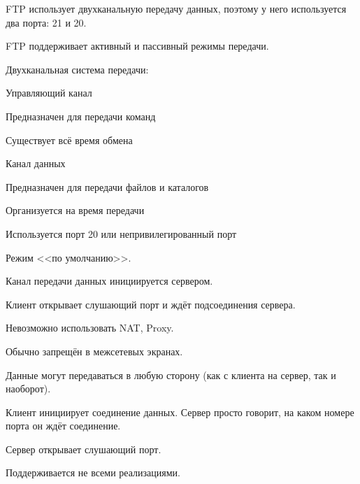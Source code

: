 FTP использует двухканальную передачу данных, поэтому у него используется два порта: 21 и 20.

FTP поддерживает активный и пассивный режимы передачи.

Двухканальная система передачи:
\begin{MyItemize}
    \item Управляющий канал
    \begin{MyItemize}
        \item Предназначен для передачи команд
        \item Существует всё время обмена
    \end{MyItemize}
    \item Канал данных
    \begin{MyItemize}
        \item Предназначен для передачи файлов и каталогов
        \item Организуется на время передачи
        \item Используется порт 20 или непривилегированный порт
    \end{MyItemize}
\end{MyItemize}


Режим <<по умолчанию>>.

Канал передачи данных инициируется сервером.

Клиент открывает слушающий порт и ждёт подсоединения сервера.

Невозможно использовать NAT, Proxy.

Обычно запрещён в межсетевых экранах.

Данные могут передаваться в любую сторону (как с клиента на сервер, так и наоборот).


Клиент инициирует соединение данных. Сервер просто говорит, на каком номере порта он ждёт соединение.

Сервер открывает слушающий порт.

Поддерживается не всеми реализациями.


